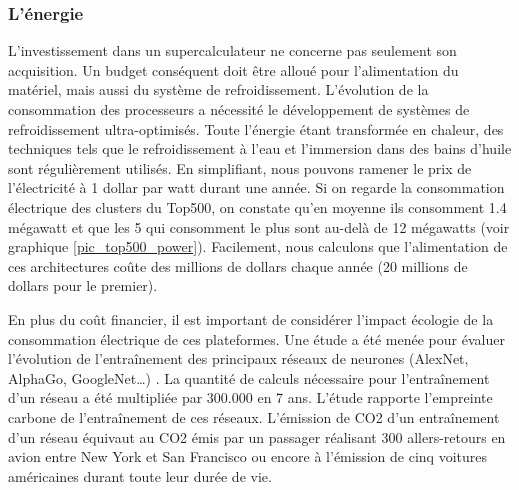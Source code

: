         

    \subsubsection{L'énergie}\label{sec:edl_chal_energie}
  
        L'investissement dans un supercalculateur ne concerne pas seulement son acquisition. Un budget conséquent doit être alloué pour l'alimentation du matériel, mais aussi du système de refroidissement. L’évolution de la consommation des processeurs a nécessité le développement de systèmes de refroidissement ultra-optimisés. Toute l’énergie étant transformée en chaleur, des techniques tels que le refroidissement à l’eau et l’immersion dans des bains d’huile sont régulièrement utilisés. En simplifiant, nous pouvons ramener le prix de l'électricité à 1 dollar par watt durant une année. Si on regarde la consommation électrique des clusters du Top500, on constate qu'en moyenne ils consomment 1.4 mégawatt et que les 5 qui consomment le plus sont au-delà de 12 mégawatts (voir graphique \ref{pic_top500_power}). Facilement, nous calculons que l'alimentation de ces architectures coûte des millions de dollars chaque année (20 millions de dollars pour le premier).
        
        En plus du coût financier, il est important de considérer l'impact écologie de la consommation électrique de ces plateformes. Une étude a été menée pour évaluer l’évolution de l’entraînement des principaux réseaux de neurones (AlexNet, AlphaGo, GoogleNet…) \cite{strubell-etal-2019-energy}. La quantité de calculs nécessaire pour l’entraînement d’un réseau a été multipliée par 300.000 en 7 ans. L’étude rapporte l’empreinte carbone de l’entraînement de ces réseaux. L’émission de CO2 d’un entraînement d’un réseau équivaut au CO2 émis par un passager réalisant 300 allers-retours en avion entre New York et San Francisco ou encore à l’émission de cinq voitures américaines durant toute leur durée de vie.
                
